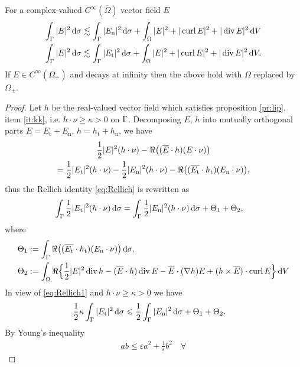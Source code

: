 \begin{lmm}\label{lm:start}
  For a complex-valued $C^{\infty}(\overline{\Omega})$ vector field $E$
  \begin{align}
    \int_{\Gamma}|E|^2\,\text{d}\sigma &\lesssim \int_{\Gamma}|E_{\text{n}}|^2\,\text{d}\sigma+\int_{\Omega}|E|^2+|\operatorname{curl} E|^2+|\operatorname{div} E|^2\,\text{d}V
    \label{eq:En}\\
    \int_{\Gamma}|E|^2\,\text{d}\sigma &\lesssim \int_{\Gamma}|E_{\text{t}}|^2\,\text{d}\sigma+\int_{\Omega}|E|^2+|\operatorname{curl} E|^2+|\operatorname{div} E|^2\,\text{d}V
    \label{eq:Et}.
  \end{align}
  If $E\in C^{\infty}(\overline{\Omega_+})$ and decays at infinity then the
  above hold with $\Omega$ replaced by $\Omega_+$.
\end{lmm}
\begin{proof}
  Let $h$ be the real-valued vector field which satisfies proposition 
  \ref{pr:lip}, item \eqref{it:kk}, i.e. $h\cdot\nu\geqslant\kappa
  >0$ on $\Gamma$. Decomposing $E$, $h$ into mutually orthogonal parts 
  $E=E_{\text{t}}+E_{\text{n}}$, $h=h_{\text{t}}+h_{\text{n}}$, we have 
  \begin{multline*}
    \frac{1}{2}|E|^2(h\cdot\nu)-\operatorname{\Re}\bigl((\overline{E}\cdot h)(E\cdot\nu)
    \bigr)\\
    =\frac{1}{2}|E_{\text{t}}|^2(h\cdot\nu)-\frac{1}{2}|E_{\text{n}}|^2(h\cdot\nu)-
    \operatorname{\Re}\bigl((\overline{E_{\text{t}}}\cdot h_{\text{t}})(E_{\text{n}}\cdot\nu)\bigr),
  \end{multline*}
  thus the Rellich identity \eqref{eq:Rellich} is rewritten as
  \begin{align}
    \int_{\Gamma}\frac{1}{2}|E_{\text{t}}|^2(h\cdot\nu)\,\text{d}\sigma&=
    \int_{\Gamma}\frac{1}{2}|E_{\text{n}}|^2(h\cdot\nu)\,\text{d}\sigma+\Theta_1+\Theta_2,
    \label{eq:Rellich1}
  \end{align}
  where
  \begin{align*}
    \Theta_1 &:=\int_{\Gamma}\operatorname{\Re}\bigl((\overline{E_{\text{t}}}\cdot h_{\text{t}})(E_{\text{n}}\cdot\nu)\bigr)\,\text{d}\sigma,
    \\
    \Theta_2 &:=\int_{\Omega}\operatorname{\Re}\Bigl\{\frac{1}{2}|E|^2\operatorname{div} h-(\overline{E}\cdot h)
    \operatorname{div} E-\overline{E}\cdot(\nabla h)E+(h\times\overline{E})\cdot\operatorname{curl} E
    \Bigr\}\,\text{d}V
  \end{align*}
  In view of \eqref{eq:Rellich1} and $h\cdot\nu\geqslant\kappa>0$
  we have
  \begin{align}\label{eq:ineq1}
    \frac{1}{2}\kappa\int_{\Gamma}|E_{\text{t}}|^2\,\text{d}\sigma&\leqslant\frac{1}{2}\int_{\Gamma}|E_{\text{n}}|^2\,\text{d}\sigma
    +\Theta_1+\Theta_2.
  \end{align} 
  By Young's inequality 
  \begin{align*}
    ab\leqslant\varepsilon a^2+\frac{1}{\varepsilon}b^2\quad\forall

\end{align*}
\end{proof}
